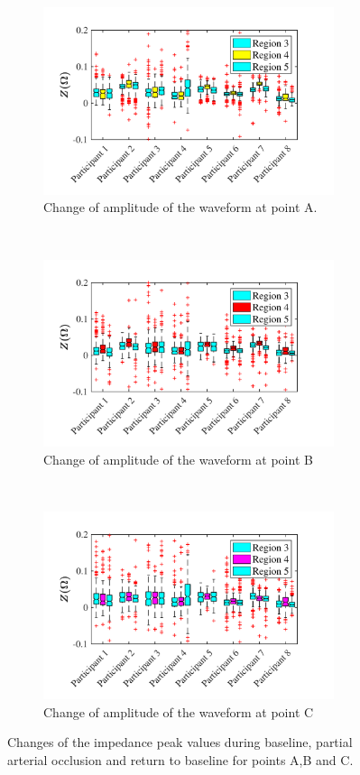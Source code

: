 \begin{figure}[!htbp]
	\centering
	\begin{subfigure}[t]{0.48\textwidth}
		\centering
		\includegraphics[height=5.5cm,keepaspectratio,trim={0.5cm 0cm 1.5cm 0 cm}, clip]{figure_apa_5a}    
		\caption{Change of amplitude of the waveform at point A.}
		\label{fig:change_A_arterial}
	\end{subfigure}%
	~ 
	\begin{subfigure}[t]{0.48\textwidth}
		\centering
		\includegraphics[height=5.5cm,keepaspectratio,trim={0.5cm 0cm 1.5cm 0 cm}, clip]{figure_apa_5b}    
		\caption{Change of amplitude of the waveform at point B}
		\label{fig:change_B_arterial}
	\end{subfigure}
	~
	\begin{subfigure}[t]{0.48\textwidth}
		\centering
		\includegraphics[height=5.5cm,keepaspectratio,trim={0.5cm 0cm 1.5cm 0 cm}, clip]{figure_apa_5c}    
		\caption{Change of amplitude of the waveform at point C}
		\label{fig:change_C_arterial}
	\end{subfigure}%
	\caption{Changes of the impedance peak values during baseline, partial arterial occlusion and return to baseline for points A,B and C.}
	\label{fig:iPG_change_points_arterial}
\end{figure}

